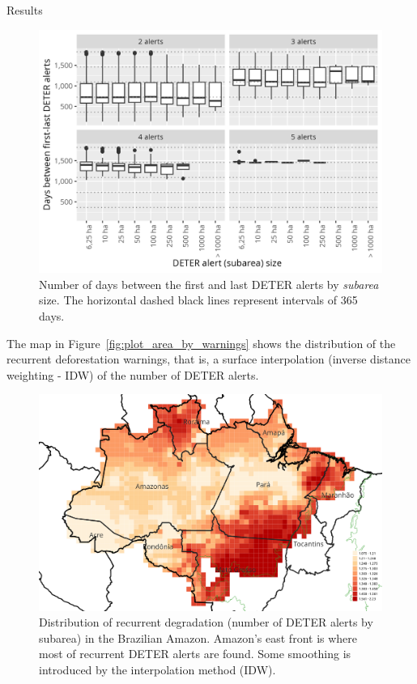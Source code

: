 \documentclass[20pt]{beamer}
\begin{document}
\begin{frame}[fragile,t]
\begin{columns}[t]
\begin{column}{0.33\linewidth}
\begin{block}{Results\vphantom{g}}
\begin{figure}[h] 
    \begin{center}
        \includegraphics[width=\linewidth]{./figures/plot_days_first_to_last.png}
        \caption{Number of days between the first and last DETER alerts by \textit{subarea} size. The horizontal dashed black lines represent intervals of 365 days.}
    \label{fig:plot_days_first_to_last}
    \end{center}
\end{figure}

        The map in Figure~\ref{fig:plot_area_by_warnings} shows the distribution of the recurrent deforestation warnings, that is, a surface interpolation (inverse distance weighting - IDW) of the number of DETER alerts.

\begin{figure}[h] 
    \begin{center}
        \includegraphics[width=\linewidth]{./figures/nwarnings_idw_map_with_legend.png}
        \caption{Distribution of recurrent degradation (number of
        DETER alerts by subarea) in the Brazilian Amazon. Amazon's east front is
        where most of recurrent DETER alerts are found. Some smoothing is introduced by the interpolation method (IDW).}
    \label{fig:nwarnings_idw_map}
    \end{center}
\end{figure}


\end{block}
\end{column}
\end{columns}
\end{frame}
\end{document}
